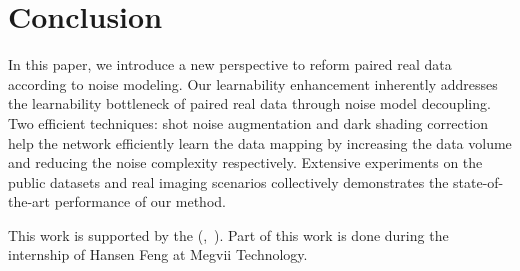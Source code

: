 \documentclass[sigconf,screen,nonacm]{acmart}
\begin{document}
\section{Conclusion}
    In this paper, we introduce a new perspective to reform paired real data according to noise modeling.
    Our learnability enhancement inherently addresses the learnability bottleneck of paired real data through noise model decoupling.
    Two efficient techniques: shot noise augmentation and dark shading correction help the network efficiently learn the data mapping by increasing the data volume and reducing the noise complexity respectively.
    Extensive experiments on the public datasets and real imaging scenarios collectively demonstrates the state-of-the-art performance of our method.






\begin{acks}
This work is supported by the  (,~). Part of this work is done during the internship of Hansen Feng at Megvii Technology.
\end{acks}



\end{document}
